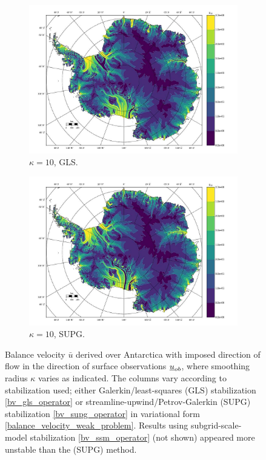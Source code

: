 \begin{figure}
  \begin{subfigure}[b]{0.45\linewidth}
    \includegraphics[width=\linewidth]{images/balance_velocity/antarctica/d_U_ob/Ubar_10H_kappa_10_GLS.jpg}
  \caption{$\kappa = 10$, GLS.}
  \label{antarctica_bv_image_d_U_ob_kappa_10_GLS}
  \end{subfigure}
  \begin{subfigure}[b]{0.45\linewidth}
    \includegraphics[width=\linewidth]{images/balance_velocity/antarctica/d_U_ob/Ubar_10H_kappa_10_SUPG.jpg}
  \caption{$\kappa = 10$, SUPG.}
  \label{antarctica_bv_image_d_U_ob_kappa_10_SUPG}
  \end{subfigure}
  
  \caption[Antarctica balance-velocity with $\mathbf{d}^{\text{data}} = \mathbf{u}_{ob}$.]{Balance velocity $\bar{u}$ derived over Antarctica with imposed direction of flow in the direction of surface observations $\underline{u}_{ob}$, where smoothing radius $\kappa$ varies as indicated.  The columns vary according to stabilization used; either Galerkin/least-squares (GLS) stabilization \cref{bv_gls_operator} or streamline-upwind/Petrov-Galerkin (SUPG) stabilization \cref{bv_supg_operator} in variational form \cref{balance_velocity_weak_problem}.  Results using subgrid-scale-model stabilization \cref{bv_ssm_operator} (not shown) appeared more unstable than the (SUPG) method. \newline \newline}


\end{figure}
